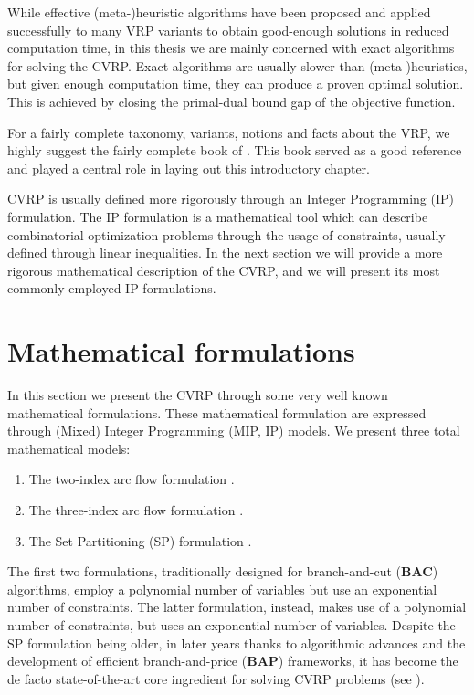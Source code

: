 While effective (meta-)heuristic algorithms have been proposed and applied
successfully to many VRP variants to obtain good-enough solutions
in reduced computation time, in this thesis we are mainly concerned
with exact algorithms for solving the CVRP.
Exact algorithms are usually slower than (meta-)heuristics, but given
enough computation time, they can produce a proven optimal solution.
This is achieved by closing the primal-dual bound gap of the objective function.

\medskip

For a fairly complete taxonomy, variants, notions and facts about the VRP, we highly suggest
the fairly complete book  of \textcite{toth2014}.
This book served as a good reference and played a central role
in laying out this introductory chapter.

\medskip


CVRP is usually defined more rigorously through an Integer Programming (IP) formulation.
The IP formulation is a mathematical tool which can describe combinatorial optimization problems
through the usage of constraints, usually defined through linear inequalities.
In the next section we will provide a more rigorous mathematical
description of the CVRP, and we will present its most commonly employed IP formulations.


\section{Mathematical formulations}
\label{sec:intro-cvrp-mathematical-formulations}

In this section we present the CVRP through some very well known mathematical formulations.
These mathematical formulation are expressed through (Mixed) Integer Programming (MIP, IP)
models.
We present three total mathematical models:
\begin{enumerate}
	\item The two-index arc flow formulation \parencite{laporte1983, laporte1985, laporte1986}.
	\item The three-index arc flow formulation \parencite{golden1977}.
	\item The Set Partitioning (SP) formulation \parencite{balinski1964}.
\end{enumerate}

The first two formulations, traditionally designed
for branch-and-cut (\textbf{BAC}) algorithms, employ a polynomial number of variables
but use an exponential number of constraints.
The latter formulation, instead, makes use of a polynomial number of constraints,
but uses an exponential number of variables.
Despite the SP formulation being older, in later years thanks to algorithmic advances
and the development of efficient branch-and-price (\textbf{BAP}) frameworks, it has become the de facto
state-of-the-art core ingredient for solving CVRP problems (see \cite{pessoa2020}).

